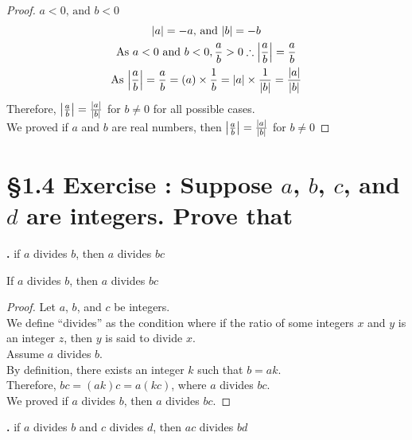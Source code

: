 \documentclass[a4paper,11pt]{article}
\DeclarePairedDelimiter\abs{\lvert}{\rvert}
\begin{document}
\begin{theorem2}
\begin{proof}
\noindent{}\(a < 0 \text{, and } b < 0\)
\begin{gather*}
\label{case4}
|a| = -a \text{, and } |b|=-b\\
\text{As } a < 0 \text{ and } b < 0, \frac{a}{b} > 0 \therefore \abs*{\frac{a}{b}} = \frac{a}{b}\\
\text{As } \abs*{\frac{a}{b}} = \frac{a}{b} = (a) \times \frac{1}{b} = \abs*{a}\times\frac{1}{\abs{b}} = \frac{\abs{a}}{\abs{b}}
\end{gather*}
Therefore, \(\abs*{\frac{a}{b}}=\frac{\abs*{a}}{\abs*{b}}\) for \(b \neq 0\) for all possible cases.\\
We proved if \(a\) and \(b\) are real numbers, then \(\abs*{\frac{a}{b}}=\frac{\abs*{a}}{\abs*{b}}\) for \(b \neq 0\)
\end{proof}
\end{theorem2}

\newpage
\addtocounter{ProblemCounter}{1}
\addtocounter{SubsectionCounter}{5}
\section*{\S 1.4 Exercise : Suppose \( a\), \( b\), \(c\), and \(d\) are integers. Prove that}
\textbf{.}
if \(a\) divides \(b\), then \(a\) divides \(bc\)

\begin{theorem3}
If \(a\) divides \(b\), then \(a\) divides \(bc\)
\begin{proof}
Let \(a\), \(b\), and \(c\) be integers.\\
We define ``divides'' as the condition where if the ratio of some integers \(x\) and \(y\) is an integer \(z\), then \(y\) is said to divide \(x\).\\
Assume \(a\) divides \(b\).\\
By definition, there exists an integer \(k\) such that \(b=ak\).\\
Therefore, \(bc = (ak)c = a(kc)\), where \(a\) divides \(bc\).\\
We proved if \(a\) divides \(b\), then \(a\) divides \(bc\).
\end{proof}
\end{theorem3}

\vspace{\baselineskip}
\addtocounter{SubsectionCounter}{3}
\noindent\textbf{.}
if \(a\) divides \(b\) and \(c\) divides \(d\), then \(ac\) divides \(bd\)
\end{document}
